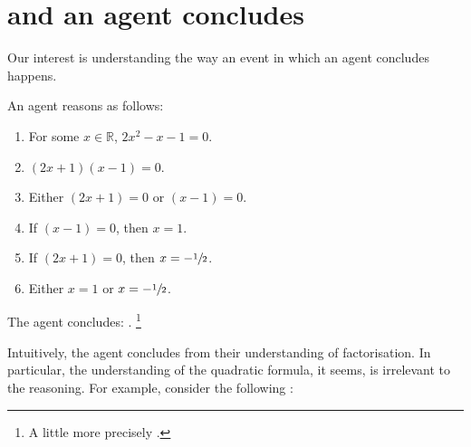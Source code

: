 \chapter{\qWhy{} and \qHow{} an agent concludes}
\label{cha:intro}


\begin{note}
  Our interest is understanding the way an event in which an agent concludes happens.

  \begin{scenario}%
    \label{illu:gist:roots:F}%
    An agent reasons as follows:
    \begin{enumerate}[label=\arabic*., ref=(\arabic*)]
    \item
      \label{illu:gist:roots:F:eq}
      For some \(x \in \mathbb{R}\), \(2x^{2} - x - 1 = 0\).
    \item
      \label{illu:gist:roots:F:factor}
      \((2x + 1)(x - 1) = 0\).%
    \item
      \label{illu:gist:roots:F:zero}
      Either \((2x + 1) = 0\) or \((x - 1) = 0\).%
    \item
      \label{illu:gist:roots:F:case:a}
      If \((x - 1) = 0\), then \(x = 1\).%
    \item
      \label{illu:gist:roots:F:case:b}
      If \((2x + 1) = 0\), then \(x = -\sfrac{1}{2}\).%
    \item
      \label{illu:gist:roots:F:factor:done}
      Either \(x = 1\) or \(x = -\sfrac{1}{2}\).%
    \end{enumerate}
    The agent concludes:
    \rootsCon{}.%
    \footnote{
      A little more precisely \rootsConFull{}.
    }
  \end{scenario}

  \noindent%
  Intuitively, the agent concludes \propI{\rootsCon{}} from their understanding of factorisation.
  In particular, the \agents{} understanding of the quadratic formula, it seems, is irrelevant to the \agents{} reasoning.
  For example, consider the following :


\end{note}
